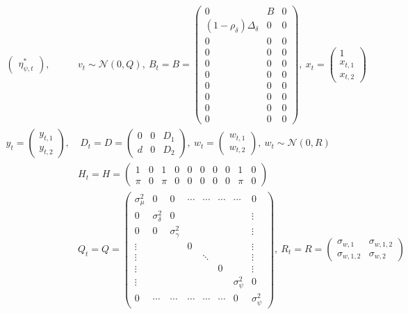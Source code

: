 \documentclass[10pt]{article}
\numberwithin{equation}{section}
\begin{document}
\begin{align*}
\begin{pmatrix}
        \eta_{\psi,t}^*
    \end{pmatrix} 
    , & v_t\sim\mathcal{N}(0,Q),
    \ 
    B_t = B = \begin{pmatrix}
        0 & B & 0 \\
        (1-\rho_{\delta})\Delta_{\delta} & 0 & 0 \\
        0 & 0 & 0 \\
        0 & 0 & 0 \\
        0 & 0 & 0 \\
        0 & 0 & 0 \\
        0 & 0 & 0 \\
        0 & 0 & 0 \\
        0 & 0 & 0 \\
        0 & 0 & 0
    \end{pmatrix},
    \ 
    x_t = \begin{pmatrix}
        1 \\
        x_{t,1} \\
        x_{t,2}
    \end{pmatrix} \\
    y_t = \begin{pmatrix}
        y_{t,1} \\
        y_{t,2} 
    \end{pmatrix},
    &\ 
    D_t = D = \begin{pmatrix}
        0 & 0 & D_1 \\
        d & 0 & D_2
    \end{pmatrix},
    \ 
    w_t = \begin{pmatrix}
        w_{t,1} \\
        w_{t,2}
    \end{pmatrix} 
    , \ w_t\sim\mathcal{N}(0,R) \\
    & H_t = H = \begin{pmatrix}
        1 & 0 &1 & 0 & 0 & 0 & 0 & 0 & 1 & 0 \\
        \pi & 0 & \pi & 0 & 0 & 0 & 0 & 0 & \pi & 0  
    \end{pmatrix}
    \\
    & Q_t = Q = \begin{pmatrix}
        \sigma_{\mu}^2 & 0 & 0 & \cdots & \cdots & \cdots & \cdots & 0 \\
        0 & \sigma_{\delta}^2 & 0 & & & & & \vdots \\
        0 & 0 & \sigma_{\gamma}^2 & & & & & \vdots \\
        \vdots & & & 0 & & & & \vdots \\
        \vdots & & & & \ddots & & & \vdots \\
        \vdots & & & & & 0 & & \vdots \\
        \vdots & & & & & & \sigma_{\psi}^2 & 0 \\
        0 & \cdots & \cdots & \cdots & \cdots & \cdots & 0 & \sigma_{\psi}^2
    \end{pmatrix}
    ,\ 
    R_t = R= \begin{pmatrix}
        \sigma_{w,1} & \sigma_{w,1,2} \\
        \sigma_{w,1,2} & \sigma_{w,2}
    \end{pmatrix}
\end{align*}
\end{document}
